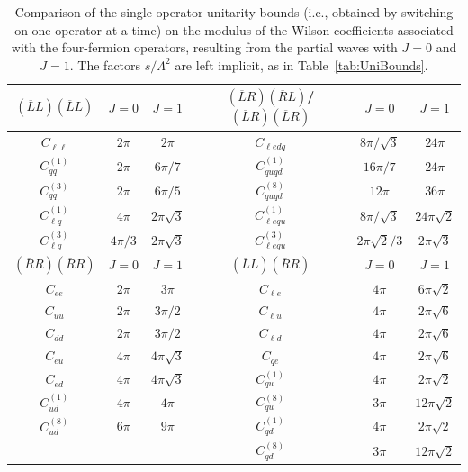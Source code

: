 \begin{table}[htbp]
\renewcommand{\arraystretch}{1.4}
\centering
\begin{tabular}{c|cc||c|cc}
\toprule
\rowcolor{hdrcolor}
\boldmath$(\overline L L)(\overline L L)$ & \boldmath$J=0$ & \boldmath$J=1$
& {\boldmath$(\overline{L}R)(\overline{R}L)$}/{\boldmath$(\overline{L}R)(\overline{L}R)$} & \boldmath$J=0$ & \boldmath$J=1$ \\
\midrule
$C_{\ell\ell}$ & $2\pi$ & $2\pi$ 
& $C_{\ell e d q}$ & $8\pi/\sqrt{3}$ & $24\pi$ \\
$C_{qq}^{(1)}$ & $2\pi$ & $6\pi/7$ 
& $C_{quqd}^{(1)}$ & $16\pi/7$ & $24\pi$ \\
$C_{qq}^{(3)}$ & $2\pi$ & $6\pi/5$ 
& $C_{quqd}^{(8)}$ & $12\pi$ & $36\pi$ \\
$C_{\ell q}^{(1)}$ & $4\pi$ & $2\pi\sqrt{3}$ 
& $C_{\ell equ}^{(1)}$ & $8\pi/\sqrt{3}$ & $24\pi\sqrt{2}$ \\
$C_{\ell q}^{(3)}$ & $4\pi/3$ & $2\pi\sqrt{3}$ 
& $C_{\ell e qu}^{(3)}$ & $2\pi\sqrt{2}/3$ & $2\pi\sqrt{3}$ \\
\midrule
\rowcolor{hdrcolor}
\boldmath$(\overline RR)(\overline RR)$ & \boldmath$J=0$ & \boldmath$J=1$
& \boldmath$(\overline L L)(\overline R R)$ & \boldmath$J=0$ & \boldmath$J=1$ \\
\midrule
$C_{ee}$ & $2\pi$ & $3\pi$ 
& $C_{\ell e}$ & $4\pi$ & $6\pi\sqrt{2}$ \\
$C_{uu}$ & $2\pi$ & $3\pi/2$ 
& $C_{\ell u}$ & $4\pi$ & $2\pi\sqrt{6}$ \\
$C_{dd}$ & $2\pi$ & $3\pi/2$ 
& $C_{\ell d}$ & $4\pi$ & $2\pi\sqrt{6}$ \\
$C_{eu}$ & $4\pi$ & $4\pi\sqrt{3}$ 
& $C_{qe}$ & $4\pi$ & $2\pi\sqrt{6}$ \\
$C_{ed}$ & $4\pi$ & $4\pi\sqrt{3}$ 
& $C_{qu}^{(1)}$ & $4\pi$ & $2\pi\sqrt{2}$ \\
$C_{ud}^{(1)}$ & $4\pi$ & $4\pi$ 
& $C_{qu}^{(8)}$ & $3\pi$ & $12\pi\sqrt{2}$ \\
$C_{ud}^{(8)}$ & $6\pi$ & $9\pi$ 
& $C_{qd}^{(1)}$ & $4\pi$ & $2\pi\sqrt{2}$ \\
& & & $C_{qd}^{(8)}$ & $3\pi$ & $12\pi\sqrt{2}$ \\
\bottomrule
\end{tabular}
\caption{Comparison of the single-operator unitarity bounds (i.e., obtained by switching on one operator at a time) on the modulus of the Wilson coefficients
associated with the four-fermion operators, resulting from the partial waves with $J=0$ and $J=1$.
The factors $s/\Lambda^2$ are left implicit, as in Table~\ref{tab:UniBounds}.}
\label{tab: UB for psi^4}
\end{table}
